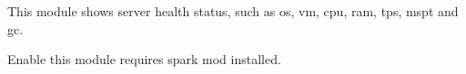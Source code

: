 
This module shows server health status, such as os, vm, cpu, ram, tps, mspt and gc.

\begin{warn}{}
    Enable this module requires spark mod installed.
\end{warn}

